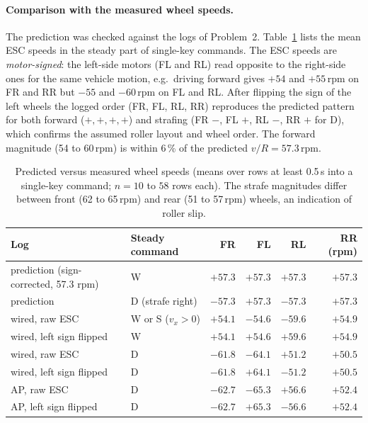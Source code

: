 \documentclass[11pt,a4paper]{article}
\begin{document}
\paragraph{Comparison with the measured wheel speeds.} The prediction was checked against the logs of Problem~2. Table~\ref{tab:pattern} lists the mean ESC speeds in the steady part of single-key commands. The ESC speeds are \emph{motor-signed}: the left-side motors (FL and RL) read opposite to the right-side ones for the same vehicle motion, e.g.\ driving forward gives $+54$ and $+55$\,rpm on FR and RR but $-55$ and $-60$\,rpm on FL and RL. After flipping the sign of the left wheels the logged order (FR, FL, RL, RR) reproduces the predicted pattern for both forward ($+,+,+,+$) and strafing (FR $-$, FL $+$, RL $-$, RR $+$ for D), which confirms the assumed roller layout and wheel order. The forward magnitude (54 to 60\,rpm) is within 6\,\% of the predicted $v/R=57.3$\,rpm.

\begin{table}[H]\centering\small
\begin{tabular}{@{}llrrrr@{}}
\toprule
\textbf{Log} & \textbf{Steady command} & \textbf{FR} & \textbf{FL} & \textbf{RL} & \textbf{RR} (rpm)\\
\midrule
prediction (sign-corrected, 57.3 rpm) & W & $+57.3$ & $+57.3$ & $+57.3$ & $+57.3$\\
prediction & D (strafe right) & $-57.3$ & $+57.3$ & $-57.3$ & $+57.3$\\
\midrule
wired, raw ESC & W or S ($v_x>0$) & $+54.1$ & $-54.6$ & $-59.6$ & $+54.9$\\
wired, left sign flipped & W & $+54.1$ & $+54.6$ & $+59.6$ & $+54.9$\\
wired, raw ESC & D & $-61.8$ & $-64.1$ & $+51.2$ & $+50.5$\\
wired, left sign flipped & D & $-61.8$ & $+64.1$ & $-51.2$ & $+50.5$\\
\midrule
AP, raw ESC & D & $-62.7$ & $-65.3$ & $+56.6$ & $+52.4$\\
AP, left sign flipped & D & $-62.7$ & $+65.3$ & $-56.6$ & $+52.4$\\
\bottomrule
\end{tabular}
\caption{Predicted versus measured wheel speeds (means over rows at least 0.5\,s into a single-key command; $n=10$ to $58$ rows each). The strafe magnitudes differ between front (62 to 65\,rpm) and rear (51 to 57\,rpm) wheels, an indication of roller slip.}\label{tab:pattern}
\end{table}
\end{document}
